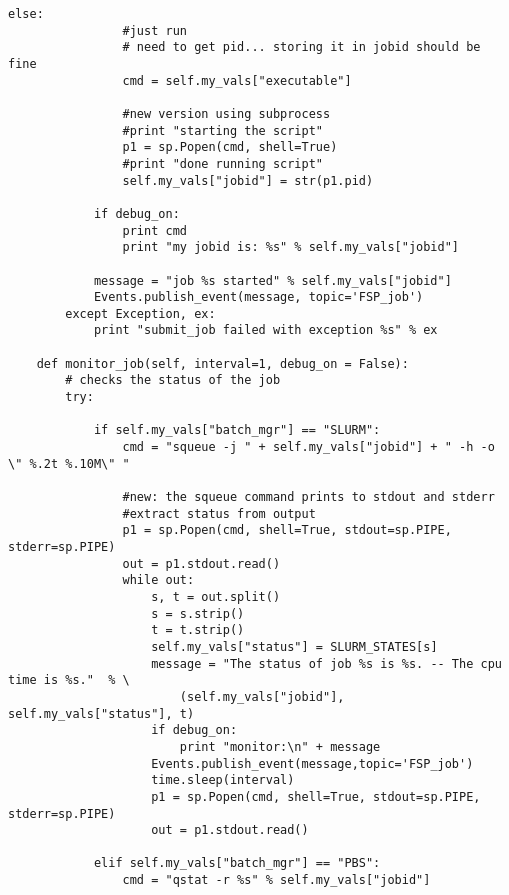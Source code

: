 \begin{lstlisting}[frame=single,
    caption={batch\_mgmt\_script.py}, label=batchscript]
            else:
                #just run
                # need to get pid... storing it in jobid should be fine
                cmd = self.my_vals["executable"] 

                #new version using subprocess
                #print "starting the script"
                p1 = sp.Popen(cmd, shell=True)
                #print "done running script"
                self.my_vals["jobid"] = str(p1.pid)

            if debug_on:
                print cmd
                print "my jobid is: %s" % self.my_vals["jobid"]
            
            message = "job %s started" % self.my_vals["jobid"]           
            Events.publish_event(message, topic='FSP_job')
        except Exception, ex:
            print "submit_job failed with exception %s" % ex
        
    def monitor_job(self, interval=1, debug_on = False):
        # checks the status of the job
        try:
            
            if self.my_vals["batch_mgr"] == "SLURM":
                cmd = "squeue -j " + self.my_vals["jobid"] + " -h -o \" %.2t %.10M\" "

                #new: the squeue command prints to stdout and stderr
                #extract status from output
                p1 = sp.Popen(cmd, shell=True, stdout=sp.PIPE, stderr=sp.PIPE)
                out = p1.stdout.read()
                while out:
                    s, t = out.split()
                    s = s.strip()
                    t = t.strip()
                    self.my_vals["status"] = SLURM_STATES[s]
                    message = "The status of job %s is %s. -- The cpu time is %s."  % \
                        (self.my_vals["jobid"], self.my_vals["status"], t)
                    if debug_on:
                        print "monitor:\n" + message
                    Events.publish_event(message,topic='FSP_job')
                    time.sleep(interval)
                    p1 = sp.Popen(cmd, shell=True, stdout=sp.PIPE, stderr=sp.PIPE)
                    out = p1.stdout.read()
                
            elif self.my_vals["batch_mgr"] == "PBS":
                cmd = "qstat -r %s" % self.my_vals["jobid"]


\end{lstlisting}
